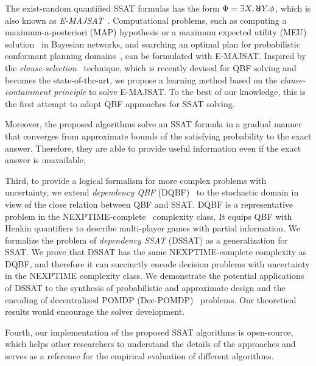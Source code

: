 The exist-random quantified SSAT formulas has the form $\Qf=\exists X,\random{}Y.\pf$,
which is also known as \textit{E-MAJSAT}~\cite{Littman1998}.
Computational problems, such as computing a maximum-a-posteriori (MAP) hypothesis or
a maximum expected utility (MEU) solution~\cite{Dechter1998} in Bayesian networks,
and searching an optimal plan for probabilistic conformant planning domains~\cite{Littman1998},
can be formulated with E-MAJSAT.
Inspired by the \textit{clause-selection}~\cite{Janota2015,Rabe2015} technique,
which is recently devised for QBF solving and becomes the state-of-the-art,
we propose a learning method based on the \textit{clause-containment principle} to solve E-MAJSAT.
To the best of our knowledge,
this is the first attempt to adopt QBF approaches for SSAT solving.

Moreover, the proposed algorithms solve an SSAT formula in a gradual manner
that converges from approximate bounds of the satisfying probability to the exact answer.
Therefore, they are able to provide useful information even if the exact answer is unavailable.

Third, to provide a logical formalism for more complex problems with uncertainty,
we extend \textit{dependency QBF} (DQBF)~\cite{Balabanov2014,Scholl2018} to the stochastic domain
in view of the close relation between QBF and SSAT.
DQBF is a representative problem in the NEXPTIME-complete~\cite{Peterson2001} complexity class.
It equips QBF with Henkin quantifiers to describe multi-player games with partial information.
We formalize the problem of \textit{dependency SSAT} (DSSAT) as a generalization for SSAT.
We prove that DSSAT has the same NEXPTIME-complete complexity as DQBF,
and therefore it can succinctly encode decision problems with uncertainty in the NEXPTIME complexity class.
We demonstrate the potential applications of DSSAT to the synthesis of probabilistic and approximate design and the encoding of decentralized POMDP (Dec-POMDP)~\cite{Oliehoek2016} problems.
Our theoretical results would encourage the solver development.

Fourth, our implementation of the proposed SSAT algorithms is open-source,
which helps other researchers to understand the details of the approaches and
serves as a reference for the empirical evaluation of different algorithms.

